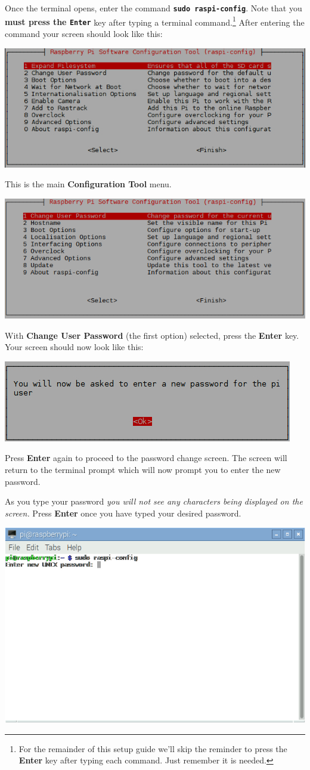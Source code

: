 \begin{enumerate}
Once the terminal opens, enter the command \textbf{\texttt{sudo~raspi-config}}. Note that you \textbf{must press the \texttt{Enter}} key after typing a terminal command.\footnote{For the remainder of this setup guide we'll skip the reminder to press the \textbf{Enter} key after typing each command. Just remember it is needed.} After entering the command your screen should look like this:

\beforefig
\centerline{\includegraphics[height=1 in]{pi_images/setup/configuration_tool_menu.jpg}}
\afterfig

This is the main \textbf{Configuration Tool} menu. 

\beforefig
\centerline{\includegraphics[height=1 in]{pi_images/setup/change_password_choice.png}}
\afterfig


With \textbf{Change User Password} (the first option) selected, press the \textbf{Enter} key. Your screen should now look like this:

\beforefig
\centerline{\includegraphics[height=1.0 in]{pi_images/setup/ChangePassword2.jpg}}
\afterfig

Press \textbf{Enter} again to proceed to the password change screen. The screen will return to the terminal prompt which will now prompt you to enter the new password.

As you type your password \textit{you will not see any characters being displayed on the screen.} Press \textbf{Enter} once you have typed your desired password.

\beforefig
\centerline{\includegraphics[height=1.5 in]{pi_images/setup/ChangePassword3.jpg}}
\afterfig


\end{enumerate}
